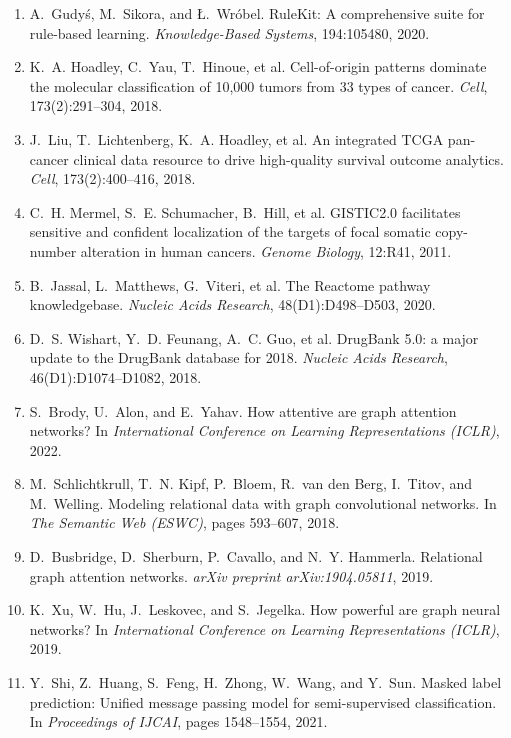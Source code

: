 \documentclass{mnnit}
\begin{document}
\begin{enumerate}
\item\label{ref:rulekit} A.~Gudy\'s, M.~Sikora, and \L.~Wr\'obel. RuleKit: A comprehensive suite for rule-based learning. \emph{Knowledge-Based Systems}, 194:105480, 2020.
\item\label{ref:hoadley} K.~A. Hoadley, C.~Yau, T.~Hinoue, et al. Cell-of-origin patterns dominate the molecular classification of 10,000 tumors from 33 types of cancer. \emph{Cell}, 173(2):291--304, 2018.
\item\label{ref:tcgacdr} J.~Liu, T.~Lichtenberg, K.~A. Hoadley, et al. An integrated TCGA pan-cancer clinical data resource to drive high-quality survival outcome analytics. \emph{Cell}, 173(2):400--416, 2018.
\item\label{ref:gistic} C.~H. Mermel, S.~E. Schumacher, B.~Hill, et al. GISTIC2.0 facilitates sensitive and confident localization of the targets of focal somatic copy-number alteration in human cancers. \emph{Genome Biology}, 12:R41, 2011.
\item\label{ref:reactome} B.~Jassal, L.~Matthews, G.~Viteri, et al. The Reactome pathway knowledgebase. \emph{Nucleic Acids Research}, 48(D1):D498--D503, 2020.
\item\label{ref:drugbank} D.~S. Wishart, Y.~D. Feunang, A.~C. Guo, et al. DrugBank 5.0: a major update to the DrugBank database for 2018. \emph{Nucleic Acids Research}, 46(D1):D1074--D1082, 2018.
\item\label{ref:gatv2} S.~Brody, U.~Alon, and E.~Yahav. How attentive are graph attention networks? In \emph{International Conference on Learning Representations (ICLR)}, 2022.
\item\label{ref:rgcn} M.~Schlichtkrull, T.~N. Kipf, P.~Bloem, R.~van den Berg, I.~Titov, and M.~Welling. Modeling relational data with graph convolutional networks. In \emph{The Semantic Web (ESWC)}, pages 593--607, 2018.
\item\label{ref:rgat} D.~Busbridge, D.~Sherburn, P.~Cavallo, and N.~Y. Hammerla. Relational graph attention networks. \emph{arXiv preprint arXiv:1904.05811}, 2019.
\item\label{ref:gin} K.~Xu, W.~Hu, J.~Leskovec, and S.~Jegelka. How powerful are graph neural networks? In \emph{International Conference on Learning Representations (ICLR)}, 2019.
\item\label{ref:transformerconv} Y.~Shi, Z.~Huang, S.~Feng, H.~Zhong, W.~Wang, and Y.~Sun. Masked label prediction: Unified message passing model for semi-supervised classification. In \emph{Proceedings of IJCAI}, pages 1548--1554, 2021.

\end{enumerate}
\end{document}
